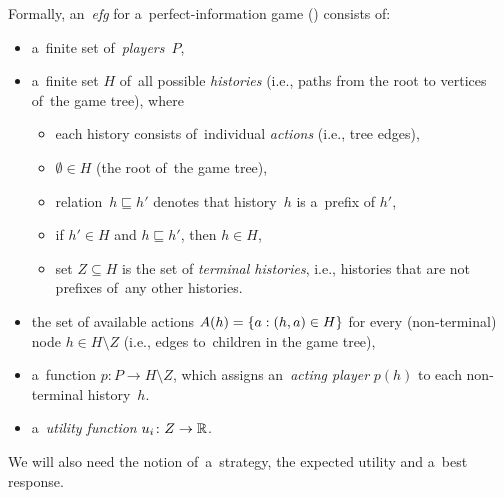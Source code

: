 Formally, an~\emph{\acrfull{efg}} for a~perfect-information game (\cite[p.~200]{Osborne1994course}) consists of:
\begin{itemize}
  \item a~finite set of~\emph{players}~$P$,

  \item a~finite set $H$ of~all possible \emph{histories} (i.e., paths from the root to vertices of~the game tree), where
    \begin{itemize}
      \item each history consists of~individual \emph{actions} (i.e., tree edges),
      \item $\emptyset \in H$ (the root of~the game tree),
      \item relation~$h \sqsubseteq h'$ denotes that history~$h$ is a~prefix of $h'$,
      \item if $h' \in H$ and $h \sqsubseteq h'$, then $h \in H$,
      \item set $Z \subseteq H$ is the set of \emph{terminal histories}, i.e., histories that are not prefixes of~any other histories.
    \end{itemize}

  \item the set of available actions $A(h) = \left\{ a: (h, a) \in H \right\}$ for every (non-terminal) node $h \in H \setminus Z$ (i.e., edges to~children in the game tree),

  \item a~function $p\colon P \to H \setminus Z$, which assigns an~\emph{acting player} $p(h)$ to each non-terminal history~$h$.

  \item a~\emph{utility function} $u_i\colon Z \rightarrow \mathbb{R}$.
\end{itemize}
We will also need the notion of~a~strategy, the expected utility and a~best response.
